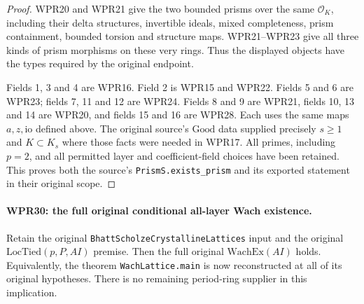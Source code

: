 \begin{proof}
WPR20 and WPR21 give the two bounded prisms over the same
$\mathcal O_K$, including their delta structures, invertible
ideals, mixed completeness, prism containment, bounded torsion
and structure maps. WPR21--WPR23 give all three kinds of
prism morphisms on these very rings. Thus the displayed
objects have the types required by the original endpoint.

Fields 1, 3 and 4 are WPR16. Field 2 is WPR15 and WPR22.
Fields 5 and 6 are WPR23; fields 7, 11 and 12 are WPR24.
Fields 8 and 9 are WPR21, fields 10, 13 and 14 are WPR20,
and fields 15 and 16 are WPR28. Each uses the same maps
$a,z,\mathrm{io}$ defined above. The original source's
$\mathrm{Good}$ data supplied precisely $s\geq1$ and
$K\subset K_s$ where those facts were needed in WPR17.
All primes, including $p=2$, and all permitted layer and
coefficient-field choices have been retained. This proves
both the source's \texttt{PrismS.exists\_prism} and its
exported statement in their original scope.
\end{proof}

\paragraph{WPR30: the full original conditional all-layer Wach existence.}
\label{claim:WPR30}
Retain the original
\texttt{Bhatt\allowbreak Scholze\allowbreak Crystalline\allowbreak Lattices}
input and the original $\mathrm{LocTied}(p,P,AI)$ premise.
Then the full original $\mathrm{WachEx}(AI)$ holds. Equivalently,
the theorem \texttt{WachLattice.main} is now reconstructed
at all of its original hypotheses. There is no remaining
period-ring supplier in this implication.

